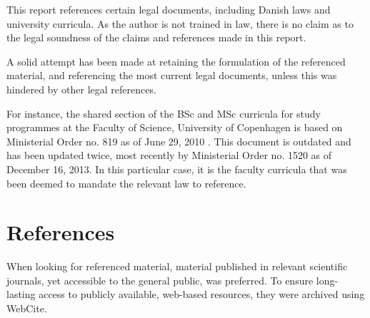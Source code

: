 This report references certain legal documents, including Danish laws and
university curricula. As the author is not trained in law, there is no claim as
to the legal soundness of the claims and references made in this report.

A solid attempt has been made at retaining the formulation of the referenced
material, and referencing the most current legal documents, unless this was
hindered by other legal references.

For instance, the shared section of the BSc and MSc curricula for study
programmes at the Faculty of Science, University of
Copenhagen\cite{faelles-del-ENG} is based on Ministerial Order no. 819 as of
June 29, 2010 \cite{bek814}. This document is outdated and has been updated
twice, most recently by Ministerial Order no.  1520 as of December 16,
2013\cite{bek1520}. In this particular case, it is the faculty curricula that
was been deemed to mandate the relevant law to reference.

\section{References}

When looking for referenced material, material published in relevant scientific
journals, yet accessible to the general public, was preferred. To ensure
long-lasting access to publicly available, web-based resources, they were
archived using WebCite\textsuperscript{\textregistered}.
